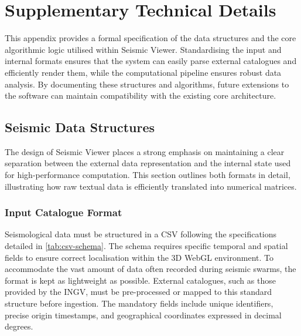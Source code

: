 
\chapter{Supplementary Technical Details}
\label{app:technical_details}

This appendix provides a formal specification of the data structures and the core algorithmic logic utilised within Seismic Viewer. Standardising the input and internal formats ensures that the system can easily parse external catalogues and efficiently render them, while the computational pipeline ensures robust data analysis. By documenting these structures and algorithms, future extensions to the software can maintain compatibility with the existing core architecture.

\section{Seismic Data Structures}
\label{sec:data_structures}

The design of Seismic Viewer places a strong emphasis on maintaining a clear separation between the external data representation and the internal state used for high-performance computation. This section outlines both formats in detail, illustrating how raw textual data is efficiently translated into numerical matrices.

\subsection{Input Catalogue Format}

Seismological data must be structured in a CSV following the specifications detailed in \cref{tab:csv-schema}. The schema requires specific temporal and spatial fields to ensure correct localisation within the 3D WebGL environment. To accommodate the vast amount of data often recorded during seismic swarms, the format is kept as lightweight as possible. External catalogues, such as those provided by the INGV, must be pre-processed or mapped to this standard structure before ingestion. The mandatory fields include unique identifiers, precise origin timestamps, and geographical coordinates expressed in decimal degrees.


